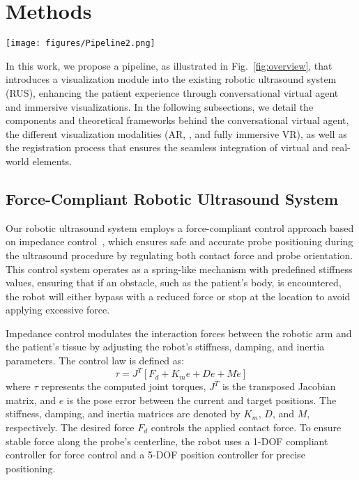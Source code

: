 \section{Methods}\label{sec:Methods}

\begin{figure*}
    \centering
    \texttt{[image: figures/Pipeline2.png]}
    \caption{\textbf{Overview of the Proposed Pipeline.} The pipeline adds a visualization module, including augmented reality and virtual reality modalities, enhanced by a virtual human assistant. The system architecture facilitates real-time interaction and synchronization between the robotic ultrasound system, the virtual agent, and the patient, providing a more engaging and patient-centered experience.}
    \label{fig:overview}
\end{figure*}


In this work, we propose a pipeline, as illustrated in Fig.~\ref{fig:overview}, that introduces a visualization module into the existing robotic ultrasound system (RUS), enhancing the patient experience through conversational virtual agent and immersive visualizations. 
In the following subsections, we detail the components and theoretical frameworks behind the conversational virtual agent, the different visualization modalities (AR, , and fully immersive VR), as well as the registration process that ensures the seamless integration of virtual and real-world elements.

\subsection{Force-Compliant Robotic Ultrasound System}

Our robotic ultrasound system employs a force-compliant control approach based on impedance control~\cite{jiang2020automatic,jiang2021autonomous,jiang2021deformation}, which ensures safe and accurate probe positioning during the ultrasound procedure by regulating both contact force and probe orientation. This control system operates as a spring-like mechanism with predefined stiffness values, ensuring that if an obstacle, such as the patient’s body, is encountered, the robot will either bypass with a reduced force or stop at the location to avoid applying excessive force.

Impedance control modulates the interaction forces between the robotic arm and the patient’s tissue by adjusting the robot’s stiffness, damping, and inertia parameters. The control law is defined as:
\begin{equation}
\tau = J^T \left[ F_d + K_m e + D \dot{e} + M \ddot{e} \right]
\end{equation}
where $\tau$ represents the computed joint torques, $J^T$ is the transposed Jacobian matrix, and $e$ is the pose error between the current and target positions. The stiffness, damping, and inertia matrices are denoted by $K_m$, $D$, and $M$, respectively. The desired force $F_d$ controls the applied contact force. To ensure stable force along the probe’s centerline, the robot uses a 1-DOF compliant controller for force control and a 5-DOF position controller for precise positioning.

